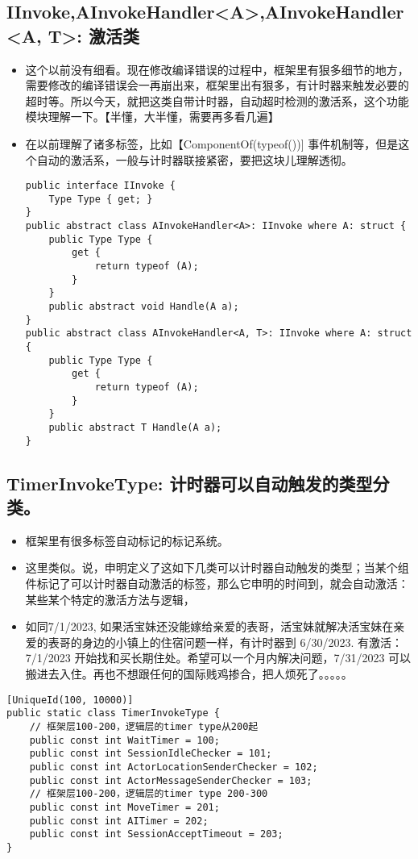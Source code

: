 \documentclass[9pt, b5paper]{article}
\begin{document}
\subsection{IInvoke,AInvokeHandler<A>,AInvokeHandler<A, T>: 激活类}
\label{sec-1-17}
\begin{itemize}
\item 这个以前没有细看。现在修改编译错误的过程中，框架里有狠多细节的地方，需要修改的编译错误会一再崩出来，框架里出有狠多，有计时器来触发必要的超时等。所以今天，就把这类自带计时器，自动超时检测的激活系，这个功能模块理解一下。【半懂，大半懂，需要再多看几遍】
\item 在以前理解了诸多标签，比如【ComponentOf(typeof())] 事件机制等，但是这个自动的激活系，一般与计时器联接紧密，要把这块儿理解透彻。
\begin{verbatim}
public interface IInvoke {
    Type Type { get; }
}
public abstract class AInvokeHandler<A>: IInvoke where A: struct {
    public Type Type {
        get {
            return typeof (A);
        }
    }
    public abstract void Handle(A a);
}
public abstract class AInvokeHandler<A, T>: IInvoke where A: struct {
    public Type Type {
        get {
            return typeof (A);
        }
    }
    public abstract T Handle(A a);
}
\end{verbatim}
\end{itemize}
\subsection{TimerInvokeType: 计时器可以自动触发的类型分类。}
\label{sec-1-18}
\begin{itemize}
\item 框架里有很多标签自动标记的标记系统。
\item 这里类似。说，申明定义了这如下几类可以计时器自动触发的类型；当某个组件标记了可以计时器自动激活的标签，那么它申明的时间到，就会自动激活：某些某个特定的激活方法与逻辑，
\item 如同7/1/2023, 如果活宝妹还没能嫁给亲爱的表哥，活宝妹就解决活宝妹在亲爱的表哥的身边的小镇上的住宿问题一样，有计时器到 6/30/2023. 有激活：7/1/2023 开始找和买长期住处。希望可以一个月内解决问题，7/31/2023 可以搬进去入住。再也不想跟任何的国际贱鸡掺合，把人烦死了。。。。。
\end{itemize}
\begin{verbatim}
[UniqueId(100, 10000)]
public static class TimerInvokeType {
    // 框架层100-200，逻辑层的timer type从200起
    public const int WaitTimer = 100;
    public const int SessionIdleChecker = 101;
    public const int ActorLocationSenderChecker = 102;
    public const int ActorMessageSenderChecker = 103;
    // 框架层100-200，逻辑层的timer type 200-300
    public const int MoveTimer = 201;
    public const int AITimer = 202;
    public const int SessionAcceptTimeout = 203;
}
\end{verbatim}
\end{document}
